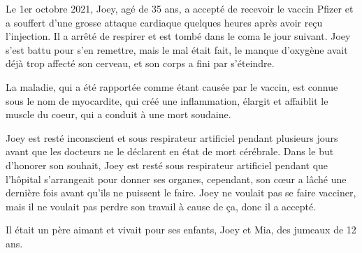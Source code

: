 Le 1er octobre 2021, Joey, agé de 35 ans, a accepté de recevoir le vaccin Pfizer
et a souffert d'une grosse attaque cardiaque quelques heures après avoir reçu
l'injection. Il a arrêté de respirer et est tombé dans le coma le jour
suivant. Joey s'est battu pour s'en remettre, mais le mal était fait, le manque
d'oxygène avait déjà trop affecté son cerveau, et son corps a fini par
s'éteindre.

La maladie, qui a été rapportée comme étant causée par le vaccin, est connue sous
le nom de myocardite, qui créé une inflammation, élargit et affaiblit le muscle
du coeur, qui a conduit à une mort soudaine.

Joey est resté inconscient et sous respirateur artificiel pendant plusieurs
jours avant que les docteurs ne le déclarent en état de mort cérébrale. Dans le
but d'honorer son souhait, Joey est resté sous respirateur artificiel pendant
que l'hôpital s'arrangeait pour donner ses organes, cependant, son cœur a lâché
une dernière fois avant qu'ils ne puissent le faire.
Joey ne voulait pas se faire vacciner, mais il ne voulait pas perdre son travail
à cause de ça, donc il a accepté.

Il était un père aimant et vivait pour ses enfants, Joey et Mia, des jumeaux de
12 ans.


